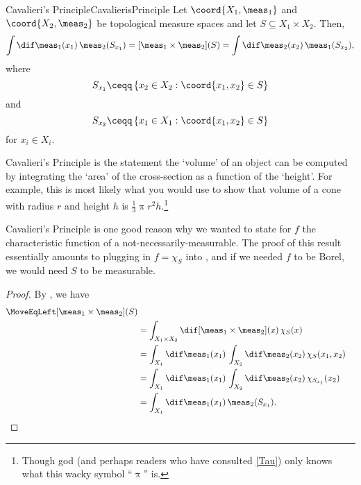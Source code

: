 \begin{crl}{Cavalieri's Principle}{CavalierisPrinciple}
Let $\coord{X_1,\meas _1}$ and $\coord{X_2,\meas _2}$ be topological measure spaces and let $S\subseteq X_1\times X_2$.  Then,
{\small
\begin{equation}\label{eqn5.2.279}
\int \dif \meas _1(x_1)\, \meas _2(S_{x_1})=[\meas _1\times \meas _2](S)=\int \dif \meas _2(x_2)\, \meas _1(S_{x_2}),
\end{equation}
}
where
\begin{equation}\label{eqn5.2.291}
S_{x_1}\ceqq \left\{ x_2\in X_2:\coord{x_1,x_2}\in S\right\}
\end{equation}
and
\begin{equation}
S_{x_2}\ceqq \left\{ x_1\in X_1:\coord{x_1,x_2}\in S\right\}
\end{equation}
for $x_i\in X_i$.
\begin{rmk}
Cavalieri's Principle is the statement the `volume' of an object can be computed by integrating the `area' of the cross-section as a function of the `height'.  For example, this is most likely what you would use to show that volume of a cone with radius $r$ and height $h$ is $\frac{1}{3}\uppi r^2h$.\footnote{Though god (and perhaps readers who have consulted \cref{Tau}) only knows what this wacky symbol ``$\uppi$'' is.}
\end{rmk}
\begin{rmk}
Cavalieri's Principle is one good reason why we wanted to state  for $f$ the characteristic function of a not-necessarily-measurable.  The proof of this result essentially amounts to plugging in $f=\chi _S$ into , and if we needed $f$ to be Borel, we would need $S$ to be measurable.
\end{rmk}
\begin{proof}
By , we have
\begin{equation}
\begin{split}
\MoveEqLeft \relax
[\meas _1\times \meas _2](S) \\
& =\int _{X_1\times X_2}\dif [\meas _1\times \meas _2](x)\, \chi _S(x) \\
& =\int _{X_1}\dif \meas _1(x_1)\, \int _{X_2}\dif \meas _2(x_2)\, \chi _S(x_1,x_2) \\
& =\int _{X_1}\dif \meas _1(x_1)\, \int _{X_2}\dif \meas _2(x_2)\, \chi _{S_{x_1}}(x_2) \\
& =\int _{X_1}\dif \meas _1(x_1)\, \meas _2(S_{x_1}).
\end{split}
\end{equation}
\end{proof}
\end{crl}

